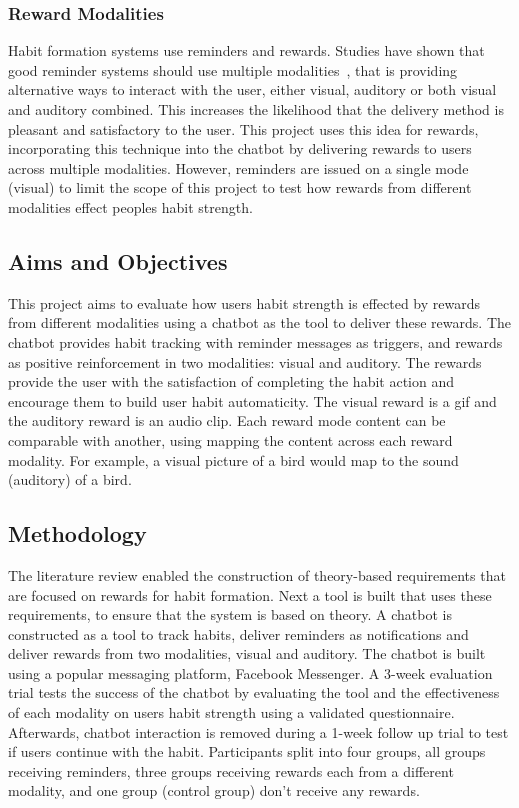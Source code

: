 \subsubsection*{Reward Modalities}
Habit formation systems use reminders and rewards.
Studies have shown that good reminder systems should use multiple modalities~\cite{article_designing_multimodal_reminders_for_home},
that is providing alternative ways to interact with the user, either visual, auditory or both visual and auditory combined.
This increases the likelihood that the delivery method is pleasant and satisfactory to the user.
This project uses this idea for rewards, incorporating this technique into the chatbot by delivering rewards to users across multiple modalities.
However, reminders are issued on a single mode (visual) to limit the scope of this project to test how rewards from different modalities effect peoples habit strength.

\subsection{Aims and Objectives}
This project aims to evaluate how users habit strength is effected by rewards from different modalities using a chatbot as the tool to deliver these rewards. The chatbot provides habit tracking with reminder messages as triggers, and rewards as positive reinforcement in two modalities: visual and auditory. The rewards provide the user with the satisfaction of completing the habit action and encourage them to build user habit automaticity.
The visual reward is a gif and the auditory reward is an audio clip.
Each reward mode content can be comparable with another, using mapping the content across each reward modality.
For example, a visual picture of a bird would map to the sound (auditory) of a bird.

\subsection*{Methodology}
The literature review enabled the construction of theory-based requirements that are focused on rewards for habit formation. Next a tool is built that uses these requirements, to ensure that the system is based on theory. A chatbot is constructed as a tool to track habits, deliver reminders as notifications and deliver rewards from two modalities, visual and auditory. The chatbot is built using a popular messaging platform, Facebook Messenger.\newline
\newline
A 3-week evaluation trial tests the success of the chatbot by evaluating the tool and the effectiveness of each modality on users habit strength using a validated questionnaire. Afterwards, chatbot interaction is removed during a 1-week follow up trial to test if users continue with the habit. Participants split into four groups, all groups receiving reminders, three groups receiving rewards each from a different modality, and one group (control group) don't receive any rewards.

